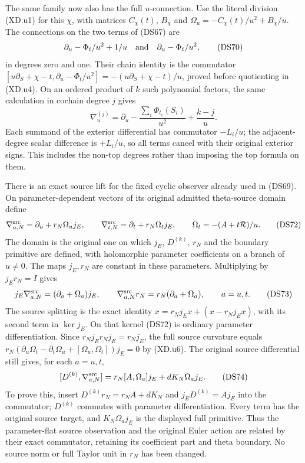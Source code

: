 
The same family now also has the full $u$-connection.  Use the
literal division (XD.u1) for this $\chi$, with matrices $C_\chi(t)$,
$B_\chi$ and $\Omega_u=-C_\chi(t)/u^2+B_\chi/u$.
The connections on the two terms of (DS67) are
\[
 \partial_u-\Phi_t/u^2+1/u\quad\hbox{and}\quad
 \partial_u-\Phi_t/u^2,                              \tag{DS70}
\]
in degrees zero and one.  Their chain identity is the commutator
$[u\partial_S+\chi-t,\partial_u-\Phi_t/u^2]
=-(u\partial_S+\chi-t)/u$, proved before quotienting in (XD.u4).
On an ordered product of $k$ such polynomial factors, the same
calculation in cochain degree $j$ gives
\[
 \nabla_u^{(j)}=\partial_u-\frac{\sum_i\Phi_{t_i}(S_i)}{u^2}
                         +\frac{k-j}{u}.             \tag{DS71}
\]
Each summand of the exterior differential has commutator $-L_i/u$;
the adjacent-degree scalar difference is $+L_i/u$, so all terms
cancel with their original exterior signs.  This includes the
non-top degrees rather than imposing the top formula on them.

There is an exact source lift for the fixed cyclic observer already
used in (DS69).  On parameter-dependent vectors of its original
admitted theta-source domain define
\[
 \nabla_{u,N}^{\rm src}=\partial_u+r_N\Omega_u j_E,
 \qquad \nabla_{t,N}^{\rm src}=\partial_t+r_N\Omega_t j_E,
 \qquad\Omega_t=-(A+t\mathcal R)/u.                  \tag{DS72}
\]
The domain is the original one on which $j_E$, $D^{(k)}$, $r_N$ and
the boundary primitive are defined, with holomorphic parameter
coefficients on a branch of $u\ne0$.  The maps $j_E,r_N$ are
constant in these parameters.  Multiplying by $j_Er_N=I$ gives
\[
 j_E\nabla_{a,N}^{\rm src}=(\partial_a+\Omega_a)j_E,
 \qquad\nabla_{a,N}^{\rm src}r_N=r_N(\partial_a+\Omega_a),
 \qquad a=u,t.                                      \tag{DS73}
\]
The source splitting is the exact identity
$x=r_Nj_Ex+(x-r_Nj_Ex)$, with its second term in $\ker j_E$.
On that kernel (DS72) is ordinary parameter differentiation.
Since $r_Nj_Er_Nj_E=r_Nj_E$, the full source curvature equals
$r_N(\partial_u\Omega_t-\partial_t\Omega_u+
[\Omega_u,\Omega_t])j_E=0$ by (XD.u6).
The original source differential still gives, for each $a=u,t$,
\[
 [D^{(k)},\nabla_{a,N}^{\rm src}]
   =r_N[A,\Omega_a]j_E+dK_N\Omega_a j_E.             \tag{DS74}
\]
To prove this, insert $D^{(k)}r_N=r_NA+dK_N$ and
$j_ED^{(k)}=Aj_E$ into the commutator; $D^{(k)}$ commutes with
parameter differentiation.  Every term has the original source
target, and $K_N\Omega_a j_E$ is the displayed full primitive.
Thus the parameter-flat source observation and the original Euler
action are related by their exact commutator, retaining its
coefficient part and theta boundary.  No source norm or full Taylor
unit in $r_N$ has been changed.
